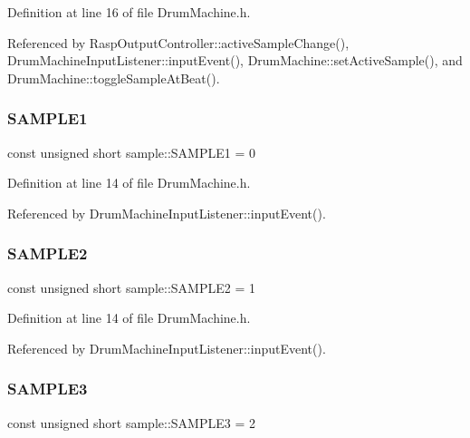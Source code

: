 Definition at line 16 of file Drum\+Machine.\+h.



Referenced by Rasp\+Output\+Controller\+::active\+Sample\+Change(), Drum\+Machine\+Input\+Listener\+::input\+Event(), Drum\+Machine\+::set\+Active\+Sample(), and Drum\+Machine\+::toggle\+Sample\+At\+Beat().

\mbox{\label{namespacesample_a59478bc0929eb3127ff4ed573d5abab5}} 
\subsubsection{\texorpdfstring{S\+A\+M\+P\+L\+E1}{SAMPLE1}}
{\footnotesize\ttfamily const unsigned short sample\+::\+S\+A\+M\+P\+L\+E1 = 0}



Definition at line 14 of file Drum\+Machine.\+h.



Referenced by Drum\+Machine\+Input\+Listener\+::input\+Event().

\mbox{\label{namespacesample_a74decdde1db22f406d0a0cc1857534f4}} 
\subsubsection{\texorpdfstring{S\+A\+M\+P\+L\+E2}{SAMPLE2}}
{\footnotesize\ttfamily const unsigned short sample\+::\+S\+A\+M\+P\+L\+E2 = 1}



Definition at line 14 of file Drum\+Machine.\+h.



Referenced by Drum\+Machine\+Input\+Listener\+::input\+Event().

\mbox{\label{namespacesample_ac0aab16a33bfcdbd978ad2efd28cd85a}} 
\subsubsection{\texorpdfstring{S\+A\+M\+P\+L\+E3}{SAMPLE3}}
{\footnotesize\ttfamily const unsigned short sample\+::\+S\+A\+M\+P\+L\+E3 = 2}




